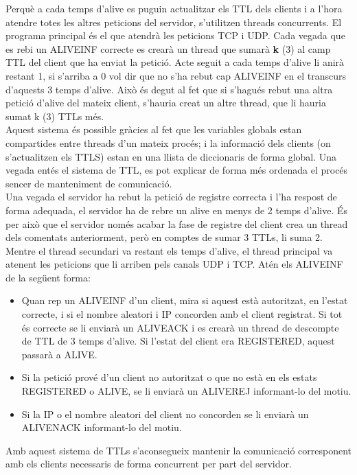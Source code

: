 \documentclass{article}
\begin{document}
Perquè a cada temps d'alive es puguin actualitzar els TTL dels clients i a l'hora
atendre totes les altres peticions del servidor, s'utilitzen threads concurrents. El
programa principal és el que atendrà les peticions TCP i UDP. Cada vegada que es rebi
un ALIVE\textunderscore INF correcte es crearà un thread que sumarà \textbf{k} (3) al
camp TTL del client que ha enviat la petició. Acte seguit a cada temps d'alive li anirà
restant 1, si s'arriba a 0 vol dir que no s'ha rebut cap ALIVE\textunderscore INF en el
transcurs d'aquests 3 temps d'alive. Això és degut al fet que si s'hagués rebut una altra 
petició d'alive del mateix client, s'hauria creat un altre thread, que li hauria 
sumat k (3) TTLs més.\\

Aquest sistema és possible gràcies al fet que les variables 
globals estan compartides entre
threads d'un mateix procés; i la informació dels clients (on s'actualitzen els
TTLS) estan en una llista de diccionaris de forma global. Una vegada entés 
el sistema de TTL, es pot explicar de forma més ordenada el procés sencer 
de manteniment de comunicació.\\

Una vegada el servidor ha rebut la petició de registre correcta i l'ha respost 
de forma adequada, el servidor ha de rebre un alive en menys de 2 temps d'alive. 
És per això que el servidor només acabar la fase de registre del client crea 
un thread dels comentats anteriorment, però en comptes de sumar 3 TTLs, li suma 2.\\
Mentre el thread secundari va restant els temps d'alive, el thread principal va
atenent les peticions que li arriben pels canals UDP i TCP. Atén els 
ALIVE\textunderscore INF de la següent forma:

\begin{itemize}

\item Quan rep un ALIVE\textunderscore INF d'un client, mira si aquest 
està autoritzat, en l'estat correcte, i si el nombre aleatori i IP 
concorden amb el client registrat. Si tot és correcte se li enviarà 
un ALIVE\textunderscore ACK i es crearà un thread de descompte de TTL 
de 3 temps d'alive. Si l'estat del client era REGISTERED, aquest
passarà a ALIVE.\\

\item Si la petició prové d'un client no autoritzat o que no està en els 
estats REGISTERED o ALIVE, se li enviarà un ALIVE\textunderscore REJ 
informant-lo del motiu.

\item Si la IP o el nombre aleatori del client no concorden se li enviarà
un ALIVE\textunderscore NACK informant-lo del motiu.
\end{itemize}
Amb aquest sistema de TTLs s'aconsegueix mantenir la comunicació corresponent
amb els clients necessaris de forma concurrent per part del servidor.
\end{document}

